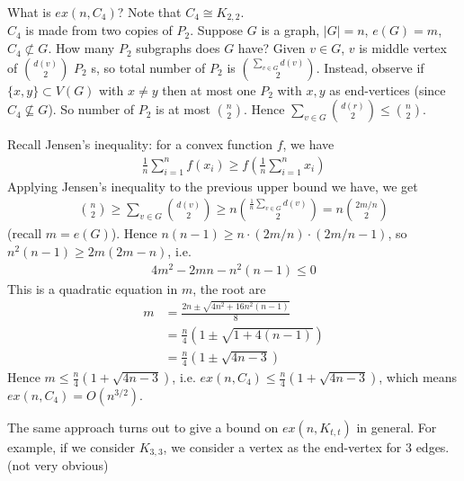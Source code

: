 \documentclass[a4paper]{article}
\begin{document}
\begin{eg}
What is $ex(n,C_4)$? Note that $C_4 \cong K_{2,2}$. \\
$C_4$ is made from two copies of $P_2$. Suppose $G$ is a graph, $|G| = n$, $e(G) = m$, $C_4 \not\subset G$. How many $P_2$ subgraphs does $G$ have? Given $v \in G$, $v$ is middle vertex of $d(v) \choose 2$ $P_2$ s, so total number of $P_2$ is $\sum_{v \in G} d(v) \choose 2$. Instead, observe if $\{x,y\} \subset V(G)$ with $x \neq y$ then at most one $P_2$ with $x,y$ as end-vertices (since $C_4 \not\subseteq G$). So number of $P_2$ is at most $n \choose 2$. Hence $\sum_{v \in G} {d(r) \choose 2} \leq {n \choose 2}$.

Recall Jensen's inequality: for a convex function $f$, we have
\begin{equation*}
\begin{aligned}
\frac{1}{n} \sum_{i=1}^n f(x_i) \geq f\left(\frac{1}{n} \sum_{i=1}^n x_i\right)
\end{aligned}
\end{equation*}
Applying Jensen's inequality to the previous upper bound we have, we get
\begin{equation*}
\begin{aligned}
{n \choose 2} \geq \sum_{v \in G} {d(v) \choose 2} \geq n{\frac{1}{n} \sum_{v \in G} d(v) \choose 2} = n {2m/n \choose 2}
\end{aligned}
\end{equation*}
(recall $m=e(G)$). Hence $n(n-1) \geq n \cdot (2m/n) \cdot (2m/n-1)$, so $n^2(n-1) \geq 2m(2m-n)$, i.e.
\begin{equation*}
\begin{aligned}
4m^2 - 2mn -n^2(n-1) \leq 0
\end{aligned}
\end{equation*}
This is a quadratic equation in $m$, the root are
\begin{equation*}
\begin{aligned}
m &= \frac{2n \pm \sqrt{4n^2+16n^2(n-1)}}{8}\\
&= \frac{n}{4}\left(1 \pm \sqrt{1+4(n-1)}\right)\\
&= \frac{n}{4}\left(1 \pm \sqrt{4n-3}\right)
\end{aligned}
\end{equation*}
Hence $m \leq \frac{n}{4}(1+\sqrt{4n-3})$, i.e. $ex(n,C_4) \leq \frac{n}{4} (1+\sqrt{4n-3})$, which means $ex(n,C_4) = O(n^{3/2})$.
\end{eg}

The same approach turns out to give a bound on $ex(n,K_{t,t})$ in general.  For example, if we consider $K_{3,3}$, we consider a vertex as the end-vertex for 3 edges. (not very obvious)
\end{document}
